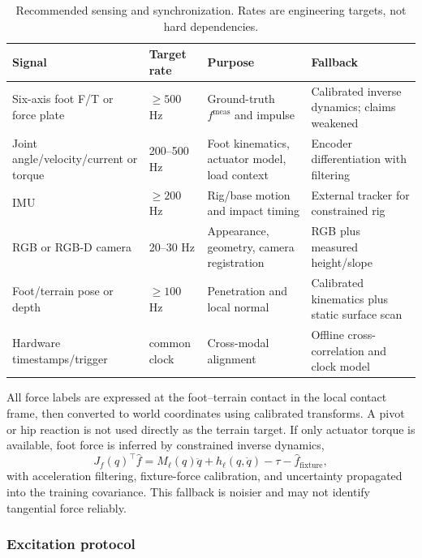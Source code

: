 \begin{table}[ht]
\centering
\caption{Recommended sensing and synchronization. Rates are engineering targets, not hard dependencies.}
\label{tab:sensors}
\small
\begin{tabularx}{\textwidth}{@{}L{29mm}L{30mm}Y Y@{}}
\toprule
\textbf{Signal} & \textbf{Target rate} & \textbf{Purpose} & \textbf{Fallback}\\
\midrule
Six-axis foot F/T or force plate & $\ge 500$ Hz & Ground-truth $f^{\mathrm{meas}}$ and impulse & Calibrated inverse dynamics; claims weakened\\
Joint angle/velocity/current or torque & 200--500 Hz & Foot kinematics, actuator model, load context & Encoder differentiation with filtering\\
IMU & $\ge 200$ Hz & Rig/base motion and impact timing & External tracker for constrained rig\\
RGB or RGB-D camera & 20--30 Hz & Appearance, geometry, camera registration & RGB plus measured height/slope\\
Foot/terrain pose or depth & $\ge 100$ Hz & Penetration and local normal & Calibrated kinematics plus static surface scan\\
Hardware timestamps/trigger & common clock & Cross-modal alignment & Offline cross-correlation and clock model\\
\bottomrule
\end{tabularx}
\end{table}

All force labels are expressed at the foot--terrain contact in the local contact frame, then converted to world coordinates using calibrated transforms. A pivot or hip reaction is not used directly as the terrain target. If only actuator torque is available, foot force is inferred by constrained inverse dynamics,
\begin{equation}
J_f(q)^\top \hat f=M_\ell(q)\ddot q+h_\ell(q,\dot q)-\tau-\hat f_{\mathrm{fixture}},
\label{eq:inverse_dynamics_force}
\end{equation}
with acceleration filtering, fixture-force calibration, and uncertainty propagated into the training covariance. This fallback is noisier and may not identify tangential force reliably.

\subsubsection{Excitation protocol}

